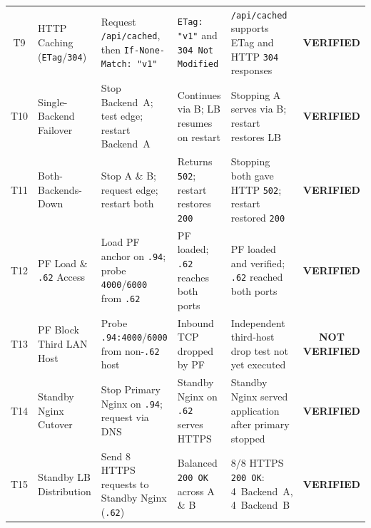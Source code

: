 \documentclass[conference]{IEEEtran}
\begin{document}
\begin{table}[t]
\begin{tabular}{@{}cl p{4.0cm} p{3.5cm} p{4.2cm} c@{}}
T9 & HTTP Caching (\texttt{ETag}/\texttt{304}) & Request \texttt{/api/cached}, then \texttt{If-None-Match: "v1"} & \texttt{ETag: "v1"} and \texttt{304 Not Modified} & \texttt{/api/cached} supports ETag and HTTP \texttt{304} responses & \textcolor{verifiedgreen}{\textbf{VERIFIED}} \\
T10 & Single-Backend Failover & Stop Backend~A; test edge; restart Backend~A & Continues via B; LB resumes on restart & Stopping A serves via B; restart restores LB & \textcolor{verifiedgreen}{\textbf{VERIFIED}} \\
T11 & Both-Backends-Down & Stop A \& B; request edge; restart both & Returns \texttt{502}; restart restores \texttt{200} & Stopping both gave HTTP \texttt{502}; restart restored \texttt{200} & \textcolor{verifiedgreen}{\textbf{VERIFIED}} \\
T12 & PF Load \& \texttt{.62} Access & Load PF anchor on \texttt{.94}; probe \texttt{4000}/\texttt{6000} from \texttt{.62} & PF loaded; \texttt{.62} reaches both ports & PF loaded and verified; \texttt{.62} reached both ports & \textcolor{verifiedgreen}{\textbf{VERIFIED}} \\
T13 & PF Block Third LAN Host & Probe \texttt{.94:4000}/\texttt{6000} from non-\texttt{.62} host & Inbound TCP dropped by PF & Independent third-host drop test not yet executed & \textcolor{unverifiedamber}{\textbf{NOT VERIFIED}} \\
T14 & Standby Nginx Cutover & Stop Primary Nginx on \texttt{.94}; request via DNS & Standby Nginx on \texttt{.62} serves HTTPS & Standby Nginx served application after primary stopped & \textcolor{verifiedgreen}{\textbf{VERIFIED}} \\
T15 & Standby LB Distribution & Send 8 HTTPS requests to Standby Nginx (\texttt{.62}) & Balanced \texttt{200 OK} across A \& B & 8/8 HTTPS \texttt{200 OK}: 4~Backend~A, 4~Backend~B & \textcolor{verifiedgreen}{\textbf{VERIFIED}} \\
\bottomrule
\end{tabular}
\end{table}
\end{document}
